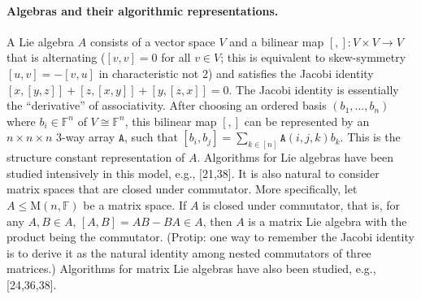 \documentclass[10pt,a4paper]{article}
\begin{document}
\paragraph{Algebras and their algorithmic representations.} A Lie algebra $A$ consists of a vector space $V$ and a bilinear map $[,]:V\times V\to V$ that is alternating ($[v,v]=0$ for all $v\in V$; this is equivalent to skew-symmetry $[u,v]=-[v,u]$ in characteristic not 2) and satisfies the Jacobi identity $[x,[y,z]]+[z,[x,y]]+[y,[z,x]]=0$. The Jacobi identity is essentially the ``derivative'' of associativity.
After choosing an ordered basis $(b_1,\ldots,b_n)$ where $b_i\in\mathbb F^n$ of $V\cong\mathbb F^n$, this bilinear map $[,]$ can be represented by an $n\times n\times n$ 3-way array $\mathtt A$, such that $[b_i,b_j]=\sum_{k\in[n]}\mathtt A(i,j,k)b_k$. This is the structure constant representation of $A$. Algorithms for Lie algebras have been studied intensively in this model, e.g., [21,38].
It is also natural to consider matrix spaces that are closed under commutator. More specifically, let $A\le\mathrm M(n,\mathbb F)$ be a matrix space. If $A$ is closed under commutator, that is, for any $A,B\in A$, $[A,B]=AB-BA\in A$, then $A$ is a matrix Lie algebra with the product being the commutator. (Protip: one way to remember the Jacobi identity is to derive it as the natural identity among nested commutators of three matrices.) Algorithms for matrix Lie algebras have also been studied, e.g., [24,36,38].
\end{document}
